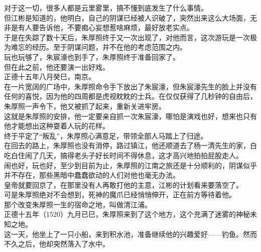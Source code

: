 \begin{multicols}{\theparacolNo}
对于这一切，很多人都是云里雾里，搞不懂到底发生了什么事情。\\

但江彬是知道的，他明白，自己的阴谋已经被人识破了，突然出来这么大场面，无非是有人要告诉他，不要痴心妄想惹啥麻烦，最好放老实点。\\

于是在失踪了数十天后，朱厚照终于又一次出现了，对他而言，这次游玩是一次极为难忘的经历。至于阴谋问题，并不在他的考虑范围之内。\\

玩也玩够了，朱宸濠也到手了，朱厚照终于准备回家了。\\

但在此之前，他还要演一出好戏。\\

正德十五年八月癸巳，南京。\\

在一片宽阔的广场中，朱厚照命令手下放出了朱宸濠，但朱宸濠先生的脸上并没有任何的喜悦，因为他的四周都是虎视眈眈的士兵。在仅仅获得了几秒钟的自由后，朱厚照一声令下，他又被抓了起来，重新关进牢房。\\

这就是朱厚照的安排，他一定要亲自抓一次朱宸濠，哪怕是演戏也好，想来也只有他才能想出这种耍着人玩的花样。\\

终于平定了“叛乱”，朱厚照心满意足，带领全部人马踏上了归途。\\

在回去的路上，朱厚照也没有消停，路过镇江，他还顺道去了杨一清先生的家，白吃白住闹了几天，搞得老头子好长时间不得休息，这才高兴地拍拍屁股走人。\\

闹也好，玩也好，至少到目前为止，朱厚照的江南之旅还是十分顺利的，阴谋似乎并不存在，那些黑暗中蠢蠢欲动的人们对他也毫无办法。\\

皇帝就要回京了，在那里没有人再敢打他的主意，江彬的计划看来要落空了。\\

可是朱厚照绝对不会想到，死神的魔爪已经悄悄伸开，正在前方等待着他。\\

那个改变朱厚照一生的宿命之地，叫做清江浦。\\

正德十五年（1520）九月已巳，朱厚照来到了这个地方，这个充满了迷雾的神秘未知之地。\\

这一天，他坐上了一只小船，来到积水池，准备继续他的兴趣爱好——钓鱼。然而不久之后，他却突然落入了水中。\\


\end{multicols}
